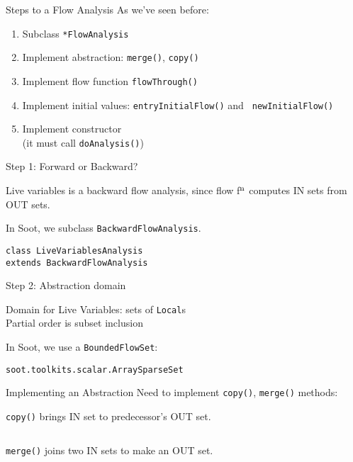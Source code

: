 \begin{slide}{Steps to a Flow Analysis}
As we've seen before:
\begin{enumerate}
\item Subclass \verb+*FlowAnalysis+
\item Implement abstraction: {\tt merge()}, {\tt copy()}
\item Implement flow function {\tt flowThrough()}
\item Implement initial values: {\tt entryInitialFlow()} and {\tt
newInitialFlow()}
\item Implement constructor \\ \quad (it must call {\tt doAnalysis()})
\end{enumerate}
\end{slide}

\begin{slide}{Step 1: Forward or Backward?}

Live variables is a backward flow analysis, since flow
f$^{\mbox{\scriptsize n}}$ computes {\sf IN} sets from {\sf OUT} sets.

\qquad

In Soot, we subclass {\tt \red BackwardFlowAnalysis}.

\qquad

{\red \tt class LiveVariablesAnalysis \\ \qquad extends BackwardFlowAnalysis}
\end{slide}

\begin{slide}{Step 2: Abstraction domain}
\vspace*{-0.2in}

Domain for Live Variables: sets of {\tt Local}s\\
Partial order is subset inclusion

\begin{center}
\scalebox{0.95}{
}
\mbox{\qquad }
\end{center}
\vspace*{-0.1in}

In Soot, we use a {\tt BoundedFlowSet}:
\begin{center}
{\tt soot.toolkits.scalar.ArraySparseSet} 
\end{center}
\end{slide}

\begin{slide}{Implementing an Abstraction}
\vspace*{-0.1in}
Need to implement {\tt copy()}, {\tt merge()} methods:
\begin{center}

\end{center}
{\tt copy()} brings IN set to predecessor's OUT set.

$\qquad$

\begin{center}

\end{center}
{\tt merge()} joins two IN sets to make an OUT set.
\end{slide}

